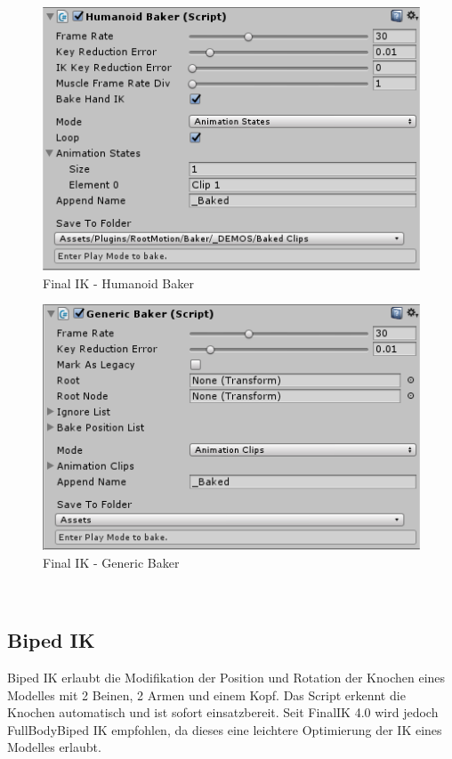 \begin {figure}
    \centering
    \includegraphics[scale=1]{pics/finalik_baker_HumanoidBakerComponent}
    \caption{Final IK - Humanoid Baker}
    \label{fig:finalIK_humanoid_baker}
\end {figure}
\begin {figure}
    \centering
    \includegraphics[scale=1]{pics/finalik_baker_GenericBakerComponent}
    \caption{Final IK - Generic Baker}
    \label{fig:finalIK_generic_baker}
\end {figure}
~\cite{FinalIK_Baker_2021}

\subsection{Biped IK}\label{subsec:biped-ik}
Biped IK erlaubt die Modifikation der Position und Rotation der Knochen eines Modelles mit 2 Beinen, 2 Armen und einem Kopf.
Das Script erkennt die Knochen automatisch und ist sofort einsatzbereit.
Seit FinalIK 4.0 wird jedoch FullBodyBiped IK empfohlen, da dieses eine leichtere Optimierung der IK eines Modelles erlaubt.

